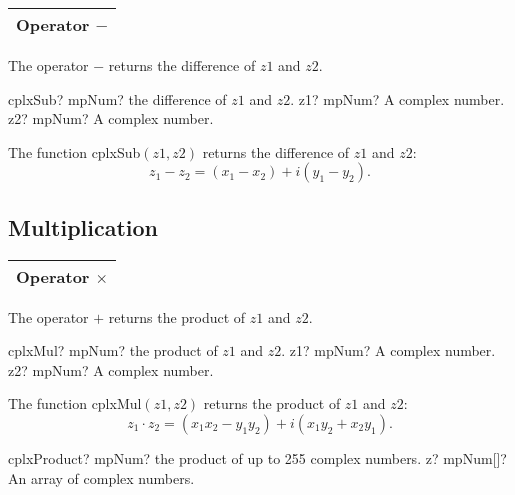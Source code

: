 \begin{tabular}{p{481pt}}
	\toprule
	\textsf{Operator \textbf{$-$}} \\
	\bottomrule
\end{tabular}

\vspace{0.3cm}
The operator $-$ returns the difference of $z1$ and $z2$.

\vspace{0.3cm}
\begin{mpFunctionsExtract}
	\mpFunctionTwo
	{cplxSub? mpNum? the difference of $z1$ and $z2$.}
	{z1? mpNum? A complex number.}
	{z2? mpNum? A complex number.}
\end{mpFunctionsExtract}

\vspace{0.3cm}
The function \textsf{cplxSub$(z1, z2)$} returns the difference of $z1$ and $z2$: 
\begin{equation}
	z_1 - z_2 =(x_1 - x_2) + i(y_1 - y_2).
\end{equation}





\subsection{Multiplication}

\begin{tabular}{p{481pt}}
	\toprule
	\textsf{Operator \textbf{$\times$}} \\
	\bottomrule
\end{tabular}

\vspace{0.3cm}
The operator $+$ returns the product of $z1$ and $z2$.

\vspace{0.3cm}
\begin{mpFunctionsExtract}
	\mpFunctionTwo
	{cplxMul? mpNum? the product of $z1$ and $z2$.}
	{z1? mpNum? A complex number.}
	{z2? mpNum? A complex number.}
\end{mpFunctionsExtract}

\vspace{0.3cm}
The function \textsf{cplxMul$(z1, z2)$} returns the product of $z1$ and $z2$: 
\begin{equation}
	z_1 \cdot z_2 =(x_1 x_2 - y_1 y_2) + i(x_1 y_2 + x_2 y_1).
\end{equation}

\vspace{0.6cm}
\begin{mpFunctionsExtract}
	\mpFunctionOne
	{cplxProduct? mpNum? the product of up to 255 complex numbers.}
	{z? mpNum[]? An array of complex numbers.}
\end{mpFunctionsExtract}




